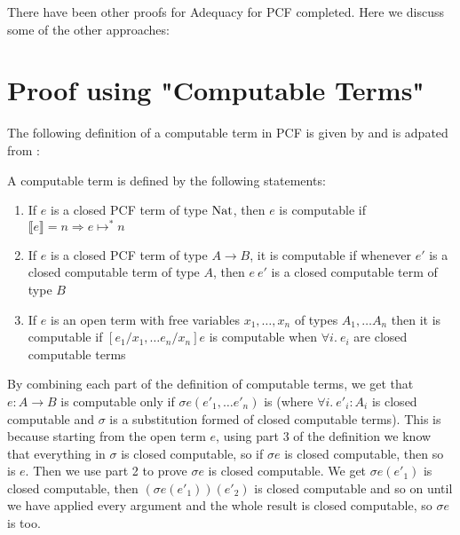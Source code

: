 There have been other proofs for Adequacy for PCF completed. Here we discuss some of the other approaches:

\section{Proof using "Computable Terms"}
The following definition of a computable term in PCF is given by \citep{Gunter92} and is adpated from \citep{Plotkin77}:

\vspace{0.5cm}

\begin{defn} A computable term is defined by the following statements:
\begin{enumerate}
\item{If $e$ is a closed PCF term of type $\operatorname{Nat}$, then $e$ is computable if $\llbracket e \rrbracket = n \Rightarrow e \mapsto^* n$}
\item{If $e$ is a closed PCF term of type $A \to B$, it is computable if whenever $e'$ is a closed computable term of type $A$, then $e \ e'$ is a closed computable term of type $B$}
\item{If $e$ is an open term with free variables $x_1, \dots, x_n$ of types $A_1, \dots A_n$ then it is computable if $[e_1/x_1, \dots e_n/x_n]e$ is computable when $\forall i. \ e_i$ are closed computable terms}
\end{enumerate}
\end{defn}  

\vspace{0.5cm}




By combining each part of the definition of computable terms, we get that $e : A \to B$ is computable only if  $\sigma e(e'_1, \dots e'_n)$ is (where $\forall i. \ e'_i :  A_i$ is closed computable and $\sigma $ is a substitution formed of closed computable terms). This is because starting from the open term $e$, using part 3 of the definition we know that everything in $\sigma$ is closed computable, so if $\sigma e$ is closed computable, then so is $e$. Then we use part 2 to prove $\sigma e$ is closed computable. We get $\sigma e (e'_1)$ is closed computable, then $(\sigma e (e'_1))(e'_2)$ is closed computable and so on until we have applied every argument and the whole result is closed computable, so $\sigma e$ is too.

